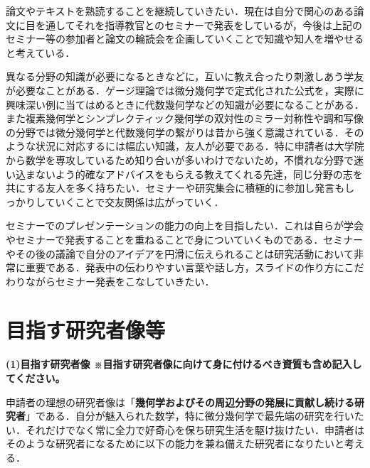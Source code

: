 \documentclass[11pt,a4j,dvipdfmx]{jarticle} 					%
\newcommand{\研究課題名}{象の卵}
\newcommand{\研究機関名}{京都大学}
\newcommand{\研究代表者氏名}{福士謙二}
\begin{document}
論文やテキストを熟読することを継続していきたい．現在は自分で関心のある論文に目を通してそれを指導教官とのセミナーで発表をしているが，今後は上記のセミナー等の参加者と論文の輪読会を企画していくことで知識や知人を増やせると考えている．



\noindent
{}


異なる分野の知識が必要になるときなどに，互いに教え合ったり刺激しあう学友が必要なことがある．ゲージ理論では微分幾何学で定式化された公式を，実際に興味深い例に当てはめるときに代数幾何学などの知識が必要になることがある．また複素幾何学とシンプレクティック幾何学の双対性のミラー対称性や調和写像の分野では微分幾何学と代数幾何学の繋がりは昔から強く意識されている．そのような状況に対応するには幅広い知識，友人が必要である．特に申請者は大学院から数学を専攻しているため知り合いが多いわけでないため，不慣れな分野で迷い込まないよう的確なアドバイスをもらえる教えてくれる先達，同じ分野の志を共にする友人を多く持ちたい．セミナーや研究集会に積極的に参加し発言もしっかりしていくことで交友関係は広がっていく．


\noindent
{}


セミナーでのプレゼンテーションの能力の向上を目指したい．これは自らが学会やセミナーで発表することを重ねることで身についていくものである．セミナーやその後の議論で自分のアイデアを円滑に伝えられることは研究活動において非常に重要である．発表中の伝わりやすい言葉や話し方，スライドの作り方にこだわりながらセミナー発表をこなしていきたい．






\section{目指す研究者像等}

\noindent
\textbf{(1)目指す研究者像 {\footnotesize ※目指す研究者像に向けて身に付けるべき資質も含め記入してください。}}

申請者の理想の研究者像は「\textbf{幾何学およびその周辺分野の発展に貢献し続ける研究者}」である．自分が魅入られた数学，特に微分幾何学で最先端の研究を行いたい．それだけでなく常に全力で好奇心を保ち研究生活を駆け抜けたい．申請者はそのような研究者になるために以下の能力を兼ね備えた研究者になりたいと考える．
\end{document}
